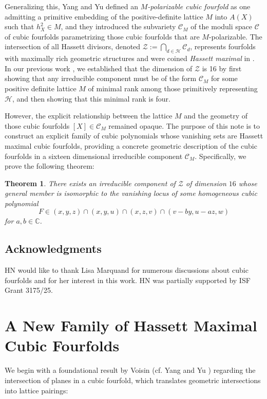 \documentclass[11pt,letterpaper]{amsart} %
\newtheorem{theorem}{Theorem}[section]
\theoremstyle{definition}
\begin{document}
Generalizing this, Yang and Yu \cite{YangYu} defined an \emph{$M$-polarizable cubic fourfold} as one admitting a primitive embedding of the positive-definite lattice $M$ into $A(X)$ such that $h_X^2 \in M$, and they introduced the subvariety $\mathcal{C}_M$ of the moduli space $\mathcal{C}$ of cubic fourfolds parametrizing those cubic fourfolds that are $M$-polarizable. %
The intersection of all Hassett divisors, denoted $\mathcal{Z} := \bigcap_{d \in \mathcal{H}} \mathcal{C}_d$, represents fourfolds with maximally rich geometric structures and were coined \emph{Hassett maximal} in \cite{Marquand}. %
In our previous work \cite{GalNuer}, we established that the dimension of $\mathcal{Z}$ is 16 by first showing that any irreducible component must be of the form $\mathcal{C}_M$ for some positive definite lattice $M$ of minimal rank among those primitively representing $\mathcal{H}$, and then showing that this minimal rank is four. %

However, the explicit relationship between the lattice $M$ and the geometry of those cubic fourfolds $[X] \in \mathcal{C}_M$ remained opaque. %
The purpose of this note is to construct an explicit family of cubic polynomials whose vanishing sets are Hassett maximal cubic fourfolds, providing a concrete geometric description of the cubic fourfolds in a sixteen dimensional irreducible component $\mathcal{C}_M$. %
Specifically, we prove the following theorem:
\begin{theorem}\label{thm:Main theorem}
    There exists an irreducible component of $\mathcal{Z}$ of dimension $16$ whose general member is isomorphic to the vanishing locus of some homogeneous cubic polynomial
    $$F \in ( x,y,z ) \cap ( x,y,u ) \cap ( x,z,v ) \cap ( v-by,u-az,w )$$
    for $a,b\in \mathbb{C}$.
\end{theorem}

\subsection*{Acknowledgments}
HN would like to thank Lisa Marquand for numerous discussions about cubic fourfolds and for her interest in this work.
HN was partially supported by ISF Grant 3175/25.


\section{A New Family of Hassett Maximal Cubic Fourfolds}

We begin with a foundational result by Voisin \cite{Voisin} (cf. Yang and Yu \cite[Theorem 6.2]{YangYu}) regarding the intersection of planes in a cubic fourfold, which translates geometric intersections into lattice pairings: %
\end{document}
